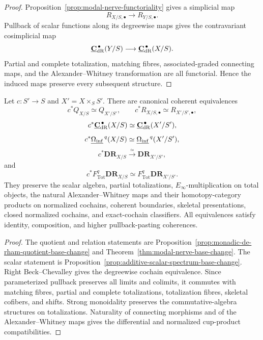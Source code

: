 \begin{proof}
Proposition~\ref{prop:modal-nerve-functoriality} gives a simplicial map
\[
    R_{X/S,\bullet}\longrightarrow R_{Y/S,\bullet}.
\]
Pullback of scalar functions along its degreewise maps gives the contravariant cosimplicial map
\[
    \underline{\mathbf C}_{\mathrm{dR}}^{\,\bullet}(Y/S)
    \longrightarrow
    \underline{\mathbf C}_{\mathrm{dR}}^{\,\bullet}(X/S).
\]
Partial and complete totalization, matching fibres, associated-graded connecting maps, and the
Alexander--Whitney transformation are all functorial.  Hence the induced maps preserve every
subsequent structure.
\end{proof}

\begin{theorem}
\label{thm:base-change-modal-de-rham-package}
Let \(c:S'\to S\) and \(X'=X\times_SS'\).  There are canonical coherent equivalences
\[
    c^*Q_{X/S}\simeq Q_{X'/S'},
    \qquad
    c^*R_{X/S,\bullet}\simeq R_{X'/S',\bullet},
\]
\[
    c^*\underline{\mathbf C}_{\mathrm{dR}}^{\,\bullet}(X/S)
    \simeq
    \underline{\mathbf C}_{\mathrm{dR}}^{\,\bullet}(X'/S'),
\]
\[
    c^*\underline{\Omega_{\mathrm{inf}}}^{\,q}(X/S)
    \simeq
    \underline{\Omega_{\mathrm{inf}}}^{\,q}(X'/S'),
\]
\[
\boxed{
    c^*\mathbf{DR}_{X/S}
    \xrightarrow{\simeq}
    \mathbf{DR}_{X'/S'},
}
\]
and
\[
    c^*F_{\mathrm{Tot}}^q\mathbf{DR}_{X/S}
    \simeq
    F_{\mathrm{Tot}}^q\mathbf{DR}_{X'/S'}.
\]
They preserve the scalar algebra, partial totalizations, \(E_\infty\)-multiplication on total
objects, the natural Alexander--Whitney maps and their homotopy-category products on normalized
cochains, coherent boundaries, skeletal presentations, closed normalized cochains, and exact-cochain classifiers.  All equivalences satisfy identity,
composition, and higher pullback-pasting coherences.
\end{theorem}

\begin{proof}
The quotient and relation statements are
Proposition~\ref{prop:monadic-de-rham-quotient-base-change} and
Theorem~\ref{thm:modal-nerve-base-change}.  The scalar statement is
Proposition~\ref{prop:additive-scalar-spectrum-base-change}.  Right Beck--Chevalley gives the
degreewise cochain equivalence.  Since parameterized pullback preserves all limits and colimits, it
commutes with matching fibres, partial and complete totalizations, totalization fibres, skeletal cofibers,
and shifts.  Strong monoidality preserves the commutative-algebra structures on totalizations.  Naturality of
connecting morphisms and of the Alexander--Whitney maps gives the differential and normalized
cup-product compatibilities.
\end{proof}

